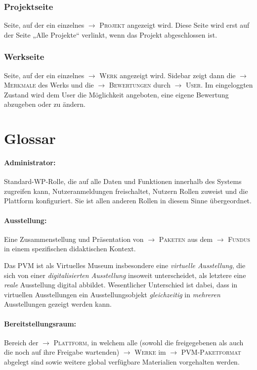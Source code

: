\documentclass[a4paper,11pt]{article}
\newcommand{\glossar}[1]{{$\to$ \textsc{#1}}}
\begin{document}
\subsubsection{Projektseite}
Seite, auf der ein einzelnes \glossar{Projekt} angezeigt wird.  Diese Seite
wird erst auf der Seite „Alle Projekte“ verlinkt, wenn das Projekt
abgeschlossen ist. 

\subsubsection{Werkseite}
Seite, auf der ein einzelnes \glossar{Werk} angezeigt wird.  Sidebar zeigt
dann die \glossar{Merkmale} des Werks und die \glossar{Bewertungen} durch
\glossar{User}.  Im eingeloggten Zustand wird dem User die Möglichkeit
angeboten, eine eigene Bewertung abzugeben oder zu ändern.

\newpage
\section{Glossar} 

\paragraph{Administrator:} 
Standard-WP-Rolle, die auf alle Daten und Funktionen innerhalb des Systems
zugreifen kann, Nutzeranmeldungen freischaltet, Nutzern Rollen zuweist und die
Plattform konfiguriert.  Sie ist allen anderen Rollen in diesem Sinne
übergeordnet.

\paragraph{Ausstellung:} 
Eine Zusammenstellung und Präsentation von \glossar{Paketen} aus dem
\glossar{Fundus} in einem spezifischen didaktischen {Kontext}.

Das PVM ist als Virtuelles Museum insbesondere eine \emph{virtuelle
  Ausstellung}, die sich von einer \emph{digitalisierten Ausstellung} insoweit
unterscheidet, als letztere eine \emph{reale} Ausstellung digital abbildet.
Wesentlicher Unterschied ist dabei, dass in virtuellen Ausstellungen ein
Ausstellungsobjekt \emph{gleichzeitig} in \emph{mehreren} Ausstellungen
gezeigt werden kann.

\paragraph{Bereitstellungsraum:} 
Bereich der \glossar{Plattform}, in welchem alle (sowohl die freigegebenen als
auch die noch auf ihre Freigabe wartenden) \glossar{Werke} im
\glossar{PVM-Paketformat} abgelegt sind sowie weitere global verfügbare
Materialien vorgehalten werden.
\end{document}
